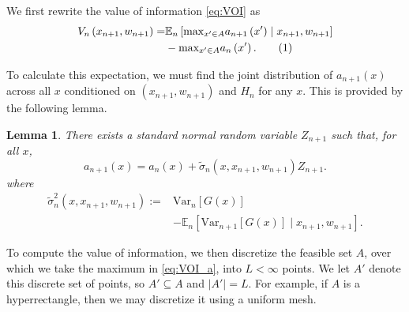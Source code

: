\documentclass{article}
\newcommand{\w}{w}
\newcommand{\sigmatilde}{\tilde{\sigma}}
\newcommand\numberthis{\addtocounter{equation}{1}\tag{\theequation}}
\newtheorem{lemma}{Lemma}
\begin{document}
We first rewrite the value of information \eqref{eq:VOI} as
\begin{align*}
V_{n}\left(x_{n+1},\w_{n+1}\right) =&\mathbb{E}_{n}\left[\mbox{max}_{x'\in A}a_{n+1}\left(x'\right) \mid x_{n+1},\w_{n+1}\right] \\
&-\mbox{max}_{x' \in A} a_{n}\left(x'\right). \numberthis 
\label{eq:VOI_a}
\end{align*}

To calculate this expectation, we must find the joint distribution of $a_{n+1}\left(x\right)$ across all $x$ conditioned on $\left(x_{n+1},\w_{n+1}\right)$ and $H_{n}$ for any $x$. 
This is provided by the following lemma.
\begin{lemma}
There exists a standard normal random variable $Z_{n+1}$ such that, for all $x$,\\
\begin{equation*}
    a_{n+1}\left(x\right) =  a_{n}\left(x\right)+\sigmatilde_n(x,x_{n+1},\w_{n+1})Z_{n+1}.
\end{equation*}
where 
\begin{align*}
\sigmatilde^2_n(x,x_{n+1},\w_{n+1}) :=& \mbox{Var}_{n}\left[G\left(x\right)\right]\\
&-\mathbb{E}_{n}\left[\mbox{Var}_{n+1}\left[G\left(x\right)\right]\mid x_{n+1},\w_{n+1}\right].
\end{align*}
\end{lemma}

To compute the value of information, we then discretize the feasible set $A$, over which we take the maximum in \eqref{eq:VOI_a}, into $L<\infty$ points.  We let $A'$ denote this discrete set of points, so $A' \subseteq A$ and $|A'|=L$. For example, if $A$ is a hyperrectangle, then we may discretize it using a uniform mesh.
\end{document}
